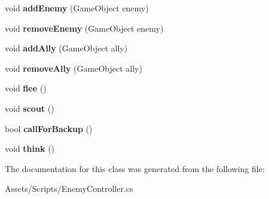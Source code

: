 \begin{DoxyCompactItemize}
\item 
\hypertarget{class_enemy_controller_1_1_agent_ad2e67bdc0957aa906a427e7b385a1bb6}{}void {\bfseries add\+Enemy} (Game\+Object enemy)\label{class_enemy_controller_1_1_agent_ad2e67bdc0957aa906a427e7b385a1bb6}

\item 
\hypertarget{class_enemy_controller_1_1_agent_af2e214b9a964b8277c4f97ff9c762251}{}void {\bfseries remove\+Enemy} (Game\+Object enemy)\label{class_enemy_controller_1_1_agent_af2e214b9a964b8277c4f97ff9c762251}

\item 
\hypertarget{class_enemy_controller_1_1_agent_a16c99220f5df752bd3bbedaa0188418e}{}void {\bfseries add\+Ally} (Game\+Object ally)\label{class_enemy_controller_1_1_agent_a16c99220f5df752bd3bbedaa0188418e}

\item 
\hypertarget{class_enemy_controller_1_1_agent_acd0813f8ea5ba116c5cb700e4dc1004f}{}void {\bfseries remove\+Ally} (Game\+Object ally)\label{class_enemy_controller_1_1_agent_acd0813f8ea5ba116c5cb700e4dc1004f}

\item 
\hypertarget{class_enemy_controller_1_1_agent_ad41969970fdcfc56ddd475c0ceea04bb}{}void {\bfseries flee} ()\label{class_enemy_controller_1_1_agent_ad41969970fdcfc56ddd475c0ceea04bb}

\item 
\hypertarget{class_enemy_controller_1_1_agent_a5c50a2432bf00a04e1365758d7182ee1}{}void {\bfseries scout} ()\label{class_enemy_controller_1_1_agent_a5c50a2432bf00a04e1365758d7182ee1}

\item 
\hypertarget{class_enemy_controller_1_1_agent_ad54d26eeeac1c75cf491c50765da9c97}{}bool {\bfseries call\+For\+Backup} ()\label{class_enemy_controller_1_1_agent_ad54d26eeeac1c75cf491c50765da9c97}

\item 
\hypertarget{class_enemy_controller_1_1_agent_a1d0126f3f76ef35fd0fe91a2e976af8f}{}void {\bfseries think} ()\label{class_enemy_controller_1_1_agent_a1d0126f3f76ef35fd0fe91a2e976af8f}

\end{DoxyCompactItemize}


The documentation for this class was generated from the following file\+:\begin{DoxyCompactItemize}
\item 
Assets/\+Scripts/Enemy\+Controller.\+cs\end{DoxyCompactItemize}
